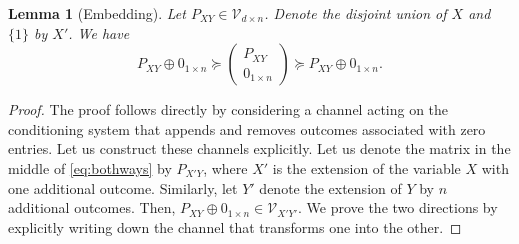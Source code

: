\documentclass[aps,pra,11pt,onecolumn,nofootinbib,tightenlines]{revtex4-2}
\newtheorem{lemma}[theorem]{Lemma}
\theoremstyle{definition}
\newcommand{\V}{\mathcal{V}}
\begin{document}
\begin{lemma}[Embedding]\label{lemma:embedding}
Let $P_{XY}\in\V_{d\times n}$. Denote the disjoint union of $X$ and $\{1\}$ by $X'$. We have
    \begin{equation}\label{eq:bothways}
P_{XY}\oplus 0_{1\times n}\succeq  \begin{pmatrix}
        P_{XY}\\
        0_{1 \times n}
    \end{pmatrix}\succeq P_{XY}\oplus 0_{1 \times n}.
\end{equation} 
\end{lemma}
\begin{proof}
The proof follows directly by considering a channel acting on the conditioning system that appends and removes outcomes associated with zero entries. Let us construct these channels explicitly. 
Let us denote the matrix in the middle of \eqref{eq:bothways} by $P_{X'Y}$, where $X'$ is the extension of the variable $X$ with one additional outcome. Similarly, let $Y'$ denote the extension of $Y$ by $n$ additional outcomes. Then, $P_{XY} \oplus 0_{1 \times n} \in \mathcal{V}_{X'Y'}$.
We prove the two directions by explicitly writing down the channel that transforms one into the other.


\end{proof}
\end{document}
